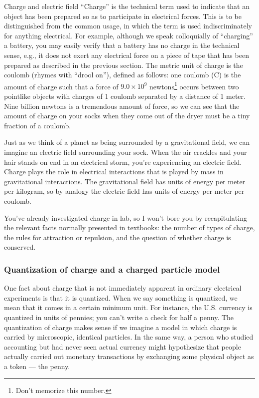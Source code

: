 \begin{envsubsection}{Charge and electric field}
	``Charge'' is the technical term used to
	indicate that an object has been prepared so as to
	participate in electrical forces. This is to be distinguished
	from the common usage, in which the term is used indiscriminately
	for anything electrical. For example, although we speak
	colloquially of ``charging'' a battery, you may easily
	verify that a battery has no charge in the technical sense,
	e.g., it does not exert any electrical force on a piece of
	tape that has been prepared as described in the previous section.
	The metric unit of charge is the
	coulomb (rhymes with ``drool on''), defined as follows:
	one coulomb (C) is the amount of charge such that
	a force of $9.0\times10^9$ newtons\footnote{Don't memorize this number.} occurs between two pointlike
	objects with charges of 1 coulomb separated by a distance of 1 meter.
	Nine billion newtons is a tremendous amount of force, so we can see that
	the amount of charge on your socks when they come out of the dryer must be
	a tiny fraction of a coulomb.

	Just as we think of a planet as being surrounded by a gravitational field,
	we can imagine an electric field surrounding your sock.
	When the air crackles and your hair stands on end in an electrical storm,
	you're experiencing an electric field.
	Charge plays the role in electrical interactions that is played by
	mass in gravitational interactions. The gravitational field has units
	of energy per meter per kilogram, so by analogy the electric field has
	units of energy per meter per coulomb.

	You've already investigated charge in lab, so I won't bore you by
	recapitulating the relevant facts normally presented in textbooks:
	the number of types of charge, the rules for attraction or repulsion,
	and the question of whether charge is conserved.

\subsubsection{Quantization of charge and a charged particle model}
	One fact about charge that is not immediately apparent in ordinary
	electrical experiments is that it is quantized. When we say something
	is quantized, we mean that
	it comes in a certain minimum unit. For instance, the U.S. currency
	is quantized in units of pennies; you can't write a check for half
	a penny. The quantization of charge makes sense if we imagine a model
	in which charge is carried by microscopic, identical particles. In the same
	way, a person who studied accounting but had never seen actual currency
	might hypothesize that people actually carried out monetary transactions by
	exchanging some physical object as a token --- the penny.


\end{envsubsection}
